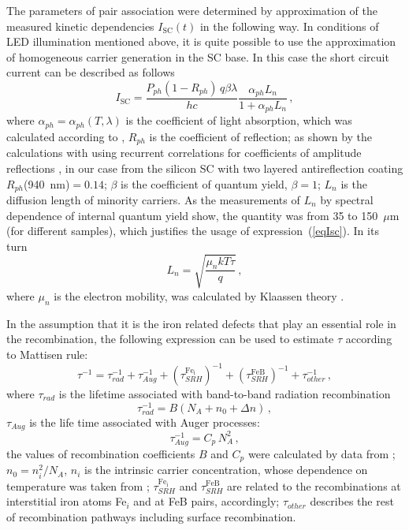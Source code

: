 \documentclass[sn-mathphys]{sn-jnl}%
\theoremstyle{thmstyleone}%
\theoremstyle{thmstyletwo}%
\theoremstyle{thmstylethree}%
\begin{document}
The parameters of pair association were determined by approximation of the measured kinetic
dependencies $I_\mathrm{SC}(t)$ in the following way.
In conditions of LED illumination mentioned above,
it is quite possible to use the approximation of homogeneous carrier generation in the SC base.
In this case the short circuit current can be described as follows \cite{Bube,Razeghi}
\begin{equation}
\label{eqIsc}
I_\mathrm{SC}=\frac{P_{ph}(1-R_{ph})\,q\beta\lambda}{hc}\frac{\alpha_{ph}L_n}{1+\alpha_{ph}L_n}\,,
\end{equation}
where
$\alpha_{ph}=\alpha_{ph}(T,\lambda)$ is the coefficient of light absorption,
which was calculated according to \cite{Si:Absorb,GreenOptic},
$R_{ph}$ is the coefficient of reflection;
as shown by the calculations with using recurrent correlations for coefficients of amplitude reflections \cite{KostRefl2000,KostRefl2000A},
in our case from the silicon SC with two layered antireflection coating $R_{ph}$(940~nm)$=0.14$;
$\beta$ is the coefficient of quantum  yield, $\beta=1$;
$L_n$  is the diffusion length of minority carriers.
As the measurements of $L_n$ by spectral dependence of internal quantum yield show,
the quantity was from 35 to 150~$\mu$m (for different samples),
which justifies the usage of expression~(\ref{eqIsc}).
In its turn
\begin{equation}
\label{eqLn}
L_n=\sqrt{\frac{\mu_nkT\tau}{q}}\,,
\end{equation}
where
$\mu_n$ is the electron mobility, was calculated by Klaassen theory \cite{KLAASSEN953}.

In the assumption that it is the iron related defects that play an essential role in the recombination,
the following expression can be used to estimate $\tau$ according to Mattisen rule:
\begin{equation}
\label{eqTau}
\tau^{-1}=\tau_{rad}^{-1}+\tau_{Aug}^{-1}+(\tau_{SRH}^{\mathrm{Fe_i}})^{-1}
+(\tau_{SRH}^\mathrm{FeB})^{-1}+\tau_{other}^{-1}\,,
\end{equation}
where
$\tau_{rad}$ is the lifetime associated with band-to-band radiation recombination
\begin{equation}
\label{eqTauRad}
\tau_{rad}^{-1}=B(N_A+n_0+\Delta n)\,,
\end{equation}
$\tau_{Aug}$ is the life time associated with Auger processes:
\begin{equation}
\label{eqTauAug}
\tau_{Aug}^{-1}=C_p\,N_A^2\,,
\end{equation}
the values of recombination coefficients $B$ and $C_p$ were calculated by data from \cite{Si_BtB,Si_Auger};
$n_0=n_i^2/N_A$,
$n_i$ is the intrinsic carrier concentration, whose dependence on temperature was taken from \cite{Si_ni_Couderc};
$\tau_{SRH}^{\mathrm{Fe_i}}$  and $\tau_{SRH}^\mathrm{FeB}$ are related to the recombinations at interstitial iron atoms Fe$_i$ and at FeB pairs, accordingly;
$\tau_{other}$ describes the rest of recombination pathways including surface recombination.
\end{document}
